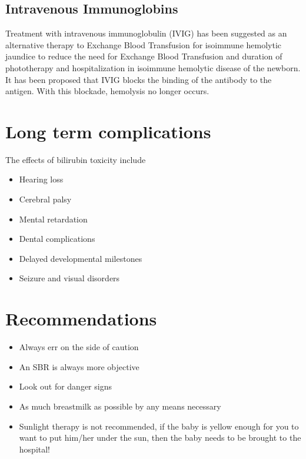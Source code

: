 \documentclass[
  letterpaper,
  DIV=11,
  numbers=noendperiod]{scrreprt}
\providecommand{\tightlist}{%
  \setlength{\itemsep}{0pt}\setlength{\parskip}{0pt}}\usepackage{longtable,booktabs,array}
\begin{document}
\hypertarget{intravenous-immunoglobins}{%
\subsection{Intravenous Immunoglobins}\label{intravenous-immunoglobins}}

Treatment with intravenous immunoglobulin (IVIG) has been suggested as
an alternative therapy to Exchange Blood Transfusion for isoimmune
hemolytic jaundice to reduce the need for Exchange Blood Transfusion and
duration of phototherapy and hospitalization in isoimmune hemolytic
disease of the newborn. It has been proposed that IVIG blocks the
binding of the antibody to the antigen. With this blockade, hemolysis no
longer occurs.

\hypertarget{long-term-complications}{%
\section{Long term complications}\label{long-term-complications}}

The effects of bilirubin toxicity include

\begin{itemize}
\tightlist
\item
  Hearing loss
\item
  Cerebral palsy
\item
  Mental retardation
\item
  Dental complications
\item
  Delayed developmental milestones
\item
  Seizure and visual disorders
\end{itemize}

\hypertarget{recommendations}{%
\section{Recommendations}\label{recommendations}}

\begin{itemize}
\tightlist
\item
  Always err on the side of caution
\item
  An SBR is always more objective
\item
  Look out for danger signs
\item
  As much breastmilk as possible by any means necessary
\item
  Sunlight therapy is not recommended, if the baby is yellow enough for
  you to want to put him/her under the sun, then the baby needs to be
  brought to the hospital!
\end{itemize}
\end{document}
